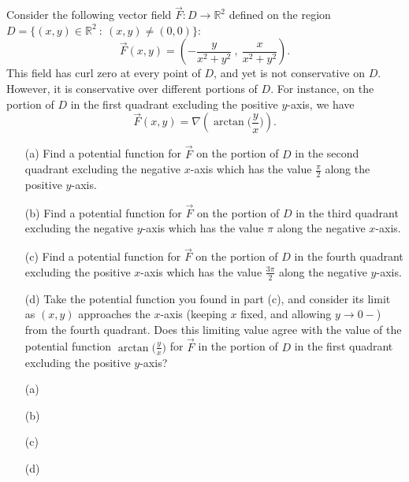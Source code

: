\documentclass[11pt,letterpaper,cm]{nupset}
\begin{document}
\begin{problem}[Exercise 10] Consider the following vector field $\vec{F}:D\to\mathbb{R}^2$ defined on the region $D=\{(x,y)\in\mathbb{R}^2\ :\ (x,y)\neq (0,0)\}$:
	$$\vec{F}(x,y) = \left(-\frac y{x^2+y^2}\ ,\ \frac x{x^2+y^2}\right).$$
	This field has curl zero at every point of $D$, and yet is not conservative on $D$. However, it is conservative over different portions of $D$. For instance, on the portion of $D$ in the first quadrant excluding the positive $y$-axis, we have
	$$\vec{F}(x,y) = \nabla\left(\arctan\Big(\frac yx\Big)\right).$$
	\begin{itemize}
		\item[(a)] Find a potential function for $\vec{F}$ on the portion of $D$ in the second quadrant excluding the negative $x$-axis which has the value $\frac\pi 2$ along the positive $y$-axis.
		\item[(b)] Find a potential function for $\vec{F}$ on the portion of $D$ in the third quadrant excluding the negative $y$-axis which has the value $\pi$ along the negative $x$-axis.
		\item[(c)] Find a potential function for $\vec{F}$ on the portion of $D$ in the fourth quadrant excluding the positive $x$-axis which has the value $\frac{3\pi}2$ along the negative $y$-axis.
		\item[(d)] Take the potential function you found in part (c), and consider its limit as $(x,y)$ approaches the $x$-axis (keeping $x$ fixed, and allowing $y\to 0-$) from the fourth quadrant. Does this limiting value agree with the value of the potential function $\displaystyle\arctan\Big(\frac yx\Big)$ for $\vec{F}$ in the portion of $D$ in the first quadrant excluding the positive $y$-axis?
	\end{itemize}
\end{problem}
\begin{solution}
	\begin{itemize}
		\item[(a)]
		\item[(b)]
		\item[(c)]
		\item[(d)]
	\end{itemize}
\end{solution}
\end{document}
